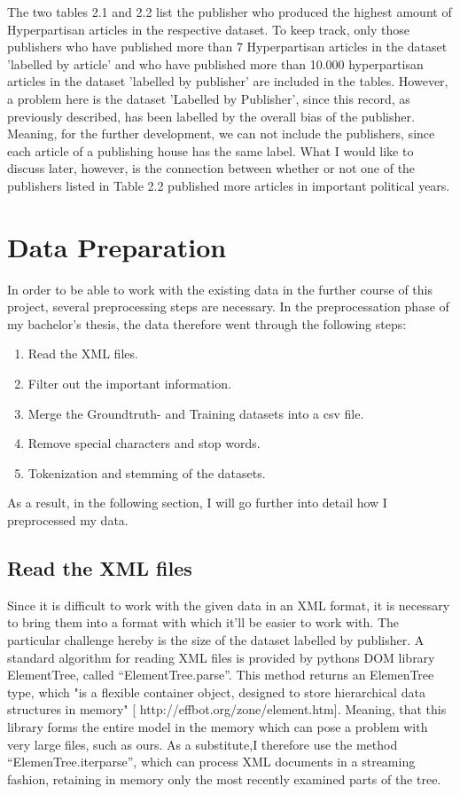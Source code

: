 \documentclass[11pt,titlepage,oneside,openany]{book}
\begin{document}
\noindent The two tables 2.1 and 2.2 list the publisher who produced the highest amount of Hyperpartisan articles in the respective dataset. To keep track, only those publishers who have published more than 7 Hyperpartisan articles in the dataset 'labelled by article' and who have published more than 10.000 hyperpartisan articles in the dataset 'labelled by publisher' are included in the tables. However, a problem here is the dataset 'Labelled by Publisher', since this record, as previously described, has been labelled by the overall bias of the publisher. Meaning, for the further development, we can not include the publishers, since each article of a publishing house has the same label. What I would like to discuss later, however, is the connection between whether or not one of the publishers listed in Table 2.2 published more articles in important political years.


\section{Data Preparation}
In order to be able to work with the existing data in the further course of this project, several preprocessing steps are necessary. In the preprocessation phase of my bachelor's thesis, the data therefore went through the following steps:
\begin{enumerate}
	\item Read the XML files. 
	\item Filter out the important information.
	\item Merge the Groundtruth- and Training datasets into a csv file.
	\item Remove special characters and stop words.
	\item Tokenization and stemming of the datasets.
\end{enumerate}	
\noindent As a result, in the following section, I will go further into detail how I preprocessed my data.


\subsection{Read the XML files}
Since it is difficult to work with the given data in an XML format, it is necessary to bring them into a format with which it’ll be easier to work with. The particular challenge hereby is the size of the dataset labelled by publisher. A standard algorithm for reading XML files is provided by pythons DOM library ElementTree, called “ElementTree.parse”. This method returns an ElemenTree type, which "is a flexible container object, designed to store hierarchical data structures in memory" [ http://effbot.org/zone/element.htm]. Meaning, that this library forms the entire model in the memory which can pose a problem with very large files, such as ours. As a substitute,I therefore use the method “ElemenTree.iterparse”, which can process XML documents in a streaming fashion, retaining in memory only the most recently examined parts of the tree. 
\end{document}
